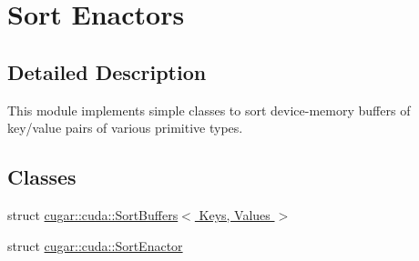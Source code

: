 \hypertarget{group___sort_enactors}{}\section{Sort Enactors}
\label{group___sort_enactors}


\subsection{Detailed Description}
This module implements simple classes to sort device-\/memory buffers of key/value pairs of various primitive types. \subsection*{Classes}
\begin{DoxyCompactItemize}
\item 
struct \hyperlink{structcugar_1_1cuda_1_1_sort_buffers}{cugar\+::cuda\+::\+Sort\+Buffers$<$ Keys, Values $>$}
\item 
struct \hyperlink{structcugar_1_1cuda_1_1_sort_enactor}{cugar\+::cuda\+::\+Sort\+Enactor}
\end{DoxyCompactItemize}
